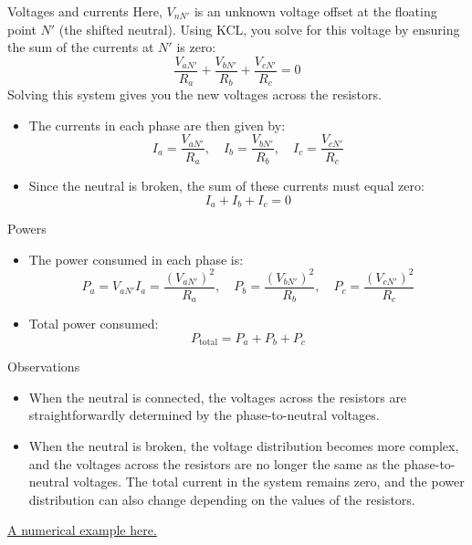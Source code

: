 \begin{frame}{Voltages and currents}
    Here, $ V_{nN'} $ is an unknown voltage offset at the floating point $ N' $ (the shifted neutral). Using KCL, you solve for this voltage by ensuring the sum of the currents at $ N' $ is zero:
    $$
    \frac{V_{aN'}}{R_a} + \frac{V_{bN'}}{R_b} + \frac{V_{cN'}}{R_c} = 0
    $$
    Solving this system gives you the new voltages across the resistors.

    \begin{itemize}
        \item The currents in each phase are then given by:
        $$
        I_a = \frac{V_{aN'}}{R_a}, \quad I_b = \frac{V_{bN'}}{R_b}, \quad I_c = \frac{V_{cN'}}{R_c}
        $$
        \item Since the neutral is broken, the sum of these currents must equal zero:
        $$
        I_a + I_b + I_c = 0
        $$
    \end{itemize}
\end{frame}

\begin{frame}{Powers}
    \begin{itemize}
        \item The power consumed in each phase is:
        $$
        P_a = V_{aN'} I_a = \frac{(V_{aN'})^2}{R_a}, \quad P_b = \frac{(V_{bN'})^2}{R_b}, \quad P_c = \frac{(V_{cN'})^2}{R_c}
        $$
        \item Total power consumed:
        $$
        P_{\text{total}} = P_a + P_b + P_c
        $$
    \end{itemize}
\end{frame}

\begin{frame}{Observations}
    \begin{itemize}
        \item When the neutral is connected, the voltages across the resistors are straightforwardly determined by the phase-to-neutral voltages.
        \item When the neutral is broken, the voltage distribution becomes more complex, and the voltages across the resistors are no longer the same as the phase-to-neutral voltages. The total current in the system remains zero, and the power distribution can also change depending on the values of the resistors.
    \end{itemize}
    \href{https://colab.research.google.com/drive/1pXH21c8g9Hv3h94pb81OtuFVQfauG63T?usp=sharing}{A numerical example here.}
\end{frame}

